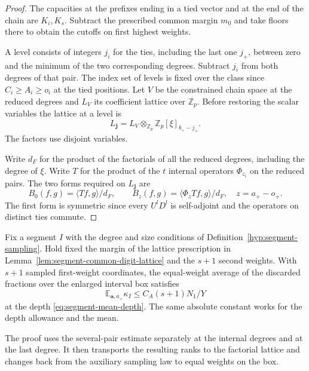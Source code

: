 \begin{proof}
The capacities at the prefixes ending in a tied vector and at
the end of the chain are \(K_i,K_s\). Subtract the prescribed
common margin \(m_0\) and take floors there to obtain the cutoffs
on first highest weights.

A level consists of integers \(j_i\) for the ties, including the
last one \(j_+\), between zero and the minimum of the two
corresponding degrees. Subtract \(j_i\) from both degrees of that
pair. The index set of levels is fixed over the class since
\(C_i\ge A_i\ge o_i\) at the tied positions. Let \(V\) be the
constrained chain space at the reduced degrees and \(L_V\) its
coefficient lattice over \(\mathbb Z_p\). Before restoring the scalar
variables the lattice at a level is
\[
 L_{\mathbf j}=L_V\otimes_{\mathbb Z_p}
       \mathbb Z_p[\xi]_{b_+-j_+}.
\]
The factors use disjoint variables.

Write \(d_F\) for the product
of the factorials of all the reduced degrees, including the
degree of \(\xi\). Write \(T\) for the product of the \(t\) internal
operators \(\Phi_{z_i}\) on the reduced pairs.
The two forms required on \(L_{\mathbf j}\) are
\[
 B_0(f,g)=\langle Tf,g\rangle/d_F,\qquad
 B_z(f,g)=\langle\Phi_z Tf,g\rangle/d_F,\quad z=a_+-o_+ .
\]
The first form is symmetric since every \(U^lD^l\) is self-adjoint
and the operators on distinct ties commute.

\end{proof}

\begin{proposition}\label{prop:segment-discard}
Fix a segment \(I\) with the degree and size conditions of
Definition~\ref{hyp:segment-sampling}. Hold fixed the margin of
the lattice prescription in Lemma~\ref{lem:segment-common-digit-lattice}
and the \(s+1\) second weights. With \(s+1\) sampled first-weight
coordinates, the equal-weight average of the discarded
fractions over the enlarged interval box satisfies
\[
 \mathbb E_{\mathbf a,a_+}\kappa_I\le C_A(s+1)N_1/Y
\]
at the depth \eqref{eq:segment-mean-depth}. The same absolute constant
works for the depth allowance and the mean.
\end{proposition}

The proof uses the several-pair estimate separately at the
internal degrees and at the last degree. It then transports
the resulting ranks to the factorial lattice and changes back
from the auxiliary sampling law to equal weights on the box.

